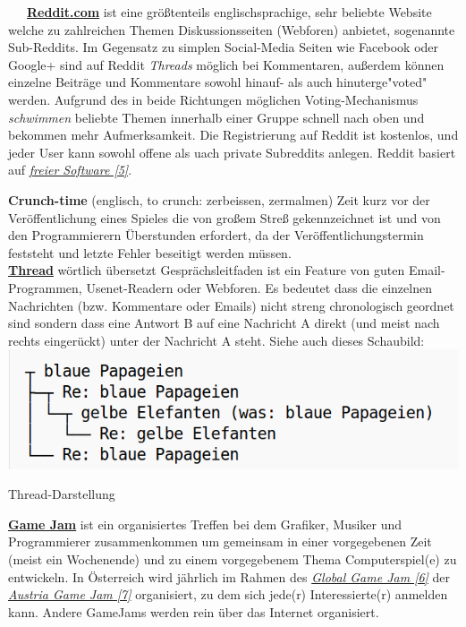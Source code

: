 ~~~\href{http://reddit.com}{\textbf{Reddit.com}} ist eine größtenteils englischsprachige, sehr beliebte Website welche zu zahlreichen Themen Diskussionsseiten (Webforen) anbietet, sogenannte Sub-Reddits. Im Gegensatz zu simplen Social-Media Seiten wie Facebook oder Google+ sind auf Reddit \textit{Threads} möglich bei Kommentaren, außerdem können einzelne Beiträge und Kommentare sowohl hinauf- als auch hinuterge"voted" werden. Aufgrund des in beide Richtungen möglichen Voting-Mechanismus \textit{schwimmen} beliebte Themen innerhalb einer Gruppe schnell nach oben und bekommen mehr Aufmerksamkeit. Die Registrierung auf Reddit ist kostenlos, und jeder User kann sowohl offene als uach private Subreddits anlegen. Reddit basiert auf \href{http://github.com/reddit/}{\textit{freier Software [5]}}.

\textbf{Crunch-time} (englisch, to crunch: zerbeissen, zermalmen) Zeit kurz vor der Veröffentlichung eines Spieles die von großem Streß gekennzeichnet ist und von den Programmierern Überstunden erfordert, da der Veröffentlichungstermin feststeht und letzte Fehler beseitigt werden müssen.\\

\href{http://de.wikipedia.org/wiki/Thread_(Internet)}{\textbf{Thread}} wörtlich übersetzt Gesprächsleitfaden ist ein Feature von guten Email-Programmen, Usenet-Readern oder Webforen. Es bedeutet dass die einzelnen Nachrichten (bzw. Kommentare oder Emails) nicht streng chronologisch geordnet sind sondern dass eine Antwort B auf eine Nachricht A direkt (und meist nach rechts eingerückt) unter der Nachricht A steht. Siehe auch dieses Schaubild:
\includegraphics[width=\linewidth]{redditrant/redditrant-threads.png} \\
\begin{center}
\footnotesize{Thread-Darstellung}
\end{center}

\href{https://en.wikipedia.org/wiki/Game_jam}{\textbf{Game Jam}} ist ein organisiertes Treffen bei dem Grafiker, Musiker und Programmierer zusammenkommen um gemeinsam in einer vorgegebenen Zeit (meist ein Wochenende) und zu einem vorgegebenem Thema Computerspiel(e) zu entwickeln. In Österreich wird jährlich im Rahmen des \href{http://globalgamejam.org/}{\textit{Global Game Jam [6]}} der \href{http://austriagamejam.org/}{\textit{Austria Game Jam [7]}} organisiert, zu dem sich jede(r) Interessierte(r) anmelden kann. Andere GameJams werden rein über das Internet organisiert. 

